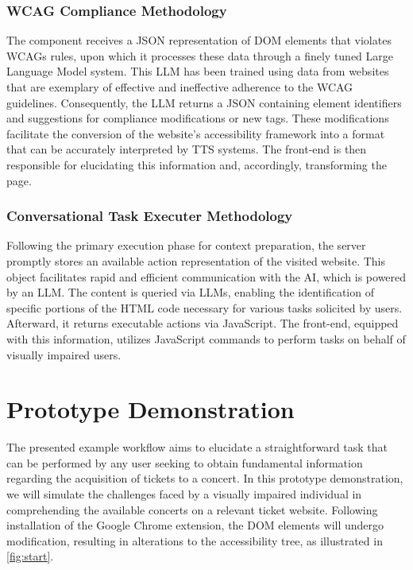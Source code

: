 \documentclass[conference]{IEEEtran}
\begin{document}
\subsubsection{WCAG Compliance Methodology}

The component receives a JSON representation of DOM elements that violates WCAGs rules, upon which it processes these data through a finely tuned Large Language Model system. This LLM has been trained using data from websites that are exemplary of effective and ineffective adherence to the WCAG guidelines. Consequently, the LLM returns a JSON containing element identifiers and suggestions for compliance modifications or new tags. These modifications facilitate the conversion of the website's accessibility framework into a format that can be accurately interpreted by TTS systems. The front-end is then responsible for elucidating this information and, accordingly, transforming the page.

\subsubsection{Conversational Task Executer Methodology}

Following the primary execution phase for context preparation, the server promptly stores an available action representation of the visited website. This object facilitates rapid and efficient communication with the AI, which is powered by an LLM. The content is queried via LLMs, enabling the identification of specific portions of the HTML code necessary for various tasks solicited by users. Afterward, it returns executable actions via JavaScript. The front-end, equipped with this information, utilizes JavaScript commands to perform tasks on behalf of visually impaired users.

\section{Prototype Demonstration}\label{demo}

The presented example workflow aims to elucidate a straightforward task that can be performed by any user seeking to obtain fundamental information regarding the acquisition of tickets to a concert. In this prototype demonstration, we will simulate the challenges faced by a visually impaired individual in comprehending the available concerts on a relevant ticket website. Following installation of the Google Chrome extension, the DOM elements will undergo modification, resulting in alterations to the accessibility tree, as illustrated in \autoref{fig:start}.
\end{document}
